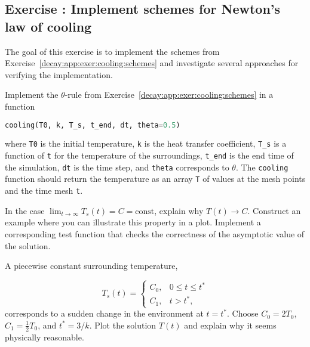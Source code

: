 \documentclass[graybox,sectrefs,envcountresetchap,open=right,final]{svmonodo}
\newenvironment{doconceexercise}{}{}
\newcounter{doconceexercisecounter}
\begin{document}
\begin{doconceexercise}

\subsection*{Exercise \thedoconceexercisecounter: Implement schemes for Newton's law of cooling}

\label{decay:app:exer:cooling:py}

The goal of this exercise is to implement the schemes from
Exercise~\ref{decay:app:exer:cooling:schemes} and investigate
several approaches for verifying the implementation.


Implement the $\theta$-rule from
Exercise~\ref{decay:app:exer:cooling:schemes} in a function

\begin{lstlisting}[language=Python,style=blue1_bluegreen]
cooling(T0, k, T_s, t_end, dt, theta=0.5)
\end{lstlisting}
where \texttt{T0} is the initial temperature, \texttt{k} is
the heat transfer coefficient, \Verb!T_s! is a function of \texttt{t} for
the temperature of the
surroundings, \Verb!t_end! is the end time of the simulation, \texttt{dt} is the
time step, and \texttt{theta} corresponds to $\theta$.  The \texttt{cooling}
function should return the temperature as an array \texttt{T} of values at
the mesh points and the time mesh \texttt{t}.



In the case $\lim_{t\rightarrow\infty}T_s(t)=C=\mbox{const}$,
explain why $T(t)\rightarrow C$. Construct an example where you
can illustrate this property in a plot. Implement a corresponding
test function that checks the correctness of the asymptotic
value of the solution.



A piecewise constant surrounding temperature,

\[ T_s(t) = \left\lbrace\begin{array}{ll} C_0,& 0\leq t\leq t^*\\ 
C_1, & t>t^*,\end{array}\right.
\]
corresponds to a sudden change in the environment
at $t=t^*$. Choose $C_0=2T_0$, $C_1=\frac{1}{2}T_0$, and
$t^*=3/k$. Plot the solution $T(t)$ and explain why it seems physically
reasonable.



\end{doconceexercise}
\end{document}
